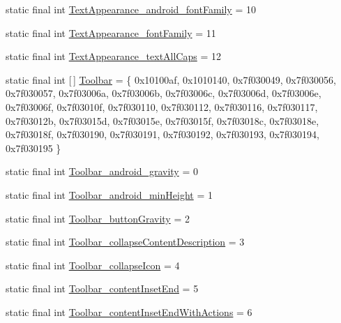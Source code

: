 \begin{DoxyCompactItemize}
\item 
static final int \mbox{\hyperlink{classandroid_1_1support_1_1v7_1_1appcompat_1_1_r_1_1styleable_a67396fb188140e0272669ea81f820da8}{Text\+Appearance\+\_\+android\+\_\+font\+Family}} = 10
\item 
static final int \mbox{\hyperlink{classandroid_1_1support_1_1v7_1_1appcompat_1_1_r_1_1styleable_a8e1fac3690f459c9a021da32eb050d39}{Text\+Appearance\+\_\+font\+Family}} = 11
\item 
static final int \mbox{\hyperlink{classandroid_1_1support_1_1v7_1_1appcompat_1_1_r_1_1styleable_af8c701cb6175c8b9e88e66d3cd60ed12}{Text\+Appearance\+\_\+text\+All\+Caps}} = 12
\item 
static final int \mbox{[}$\,$\mbox{]} \mbox{\hyperlink{classandroid_1_1support_1_1v7_1_1appcompat_1_1_r_1_1styleable_a2daba9587ef9f700f2d54cf13435cb32}{Toolbar}} = \{ 0x10100af, 0x1010140, 0x7f030049, 0x7f030056, 0x7f030057, 0x7f03006a, 0x7f03006b, 0x7f03006c, 0x7f03006d, 0x7f03006e, 0x7f03006f, 0x7f03010f, 0x7f030110, 0x7f030112, 0x7f030116, 0x7f030117, 0x7f03012b, 0x7f03015d, 0x7f03015e, 0x7f03015f, 0x7f03018c, 0x7f03018e, 0x7f03018f, 0x7f030190, 0x7f030191, 0x7f030192, 0x7f030193, 0x7f030194, 0x7f030195 \}
\item 
static final int \mbox{\hyperlink{classandroid_1_1support_1_1v7_1_1appcompat_1_1_r_1_1styleable_a84a79bd8c687a1eef63dda96bb410f01}{Toolbar\+\_\+android\+\_\+gravity}} = 0
\item 
static final int \mbox{\hyperlink{classandroid_1_1support_1_1v7_1_1appcompat_1_1_r_1_1styleable_a3b8399b2cca0ff98749346ebd5d6bf70}{Toolbar\+\_\+android\+\_\+min\+Height}} = 1
\item 
static final int \mbox{\hyperlink{classandroid_1_1support_1_1v7_1_1appcompat_1_1_r_1_1styleable_a2733cf58d3beef3449da4e6eba007a0b}{Toolbar\+\_\+button\+Gravity}} = 2
\item 
static final int \mbox{\hyperlink{classandroid_1_1support_1_1v7_1_1appcompat_1_1_r_1_1styleable_a3734d32ea95a0b5d4bf4bff52ec5c6c0}{Toolbar\+\_\+collapse\+Content\+Description}} = 3
\item 
static final int \mbox{\hyperlink{classandroid_1_1support_1_1v7_1_1appcompat_1_1_r_1_1styleable_a04b9e91185914dcad81da762ac83b99e}{Toolbar\+\_\+collapse\+Icon}} = 4
\item 
static final int \mbox{\hyperlink{classandroid_1_1support_1_1v7_1_1appcompat_1_1_r_1_1styleable_aecbe2eaa8751ce5821a8e641d2eb9584}{Toolbar\+\_\+content\+Inset\+End}} = 5
\item 
static final int \mbox{\hyperlink{classandroid_1_1support_1_1v7_1_1appcompat_1_1_r_1_1styleable_ad02fa08b47505549c358225345d747ff}{Toolbar\+\_\+content\+Inset\+End\+With\+Actions}} = 6

\end{DoxyCompactItemize}
